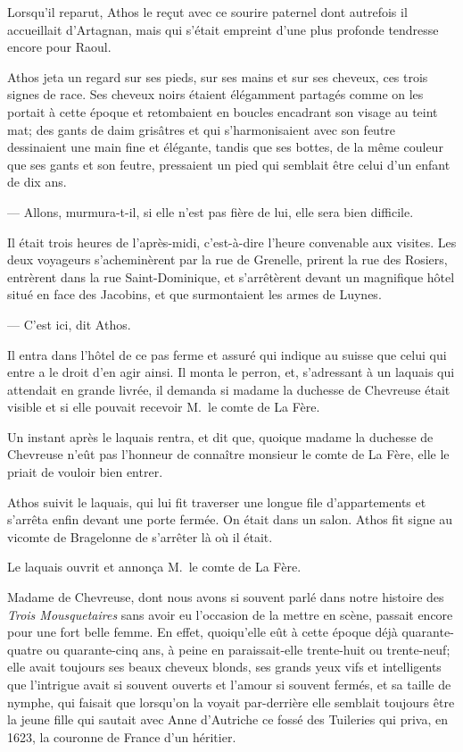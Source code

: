 Lorsqu'il reparut, Athos le reçut avec ce sourire paternel dont autrefois il accueillait d'Artagnan, mais qui s'était empreint d'une plus profonde tendresse encore pour Raoul.

Athos jeta un regard sur ses pieds, sur ses mains et sur ses cheveux, ces trois signes de race. Ses cheveux noirs étaient élégamment partagés comme on les portait à cette époque et retombaient en boucles encadrant son visage au teint mat; des gants de daim grisâtres et qui s'harmonisaient avec son feutre dessinaient une main fine et élégante, tandis que ses bottes, de la même couleur que ses gants et son feutre, pressaient un pied qui semblait être celui d'un enfant de dix ans.

— Allons, murmura-t-il, si elle n'est pas fière de lui, elle sera bien difficile.

Il était trois heures de l'après-midi, c'est-à-dire l'heure convenable aux visites. Les deux voyageurs s'acheminèrent par la rue de Grenelle, prirent la rue des Rosiers, entrèrent dans la rue Saint-Dominique, et s'arrêtèrent devant un magnifique hôtel situé en face des Jacobins, et que surmontaient les armes de Luynes.

— C'est ici, dit Athos.

Il entra dans l'hôtel de ce pas ferme et assuré qui indique au suisse que celui qui entre a le droit d'en agir ainsi. Il monta le perron, et, s'adressant à un laquais qui attendait en grande livrée, il demanda si madame la duchesse de Chevreuse était visible et si elle pouvait recevoir M.~le comte de La Fère.

Un instant après le laquais rentra, et dit que, quoique madame la duchesse de Chevreuse n'eût pas l'honneur de connaître monsieur le comte de La Fère, elle le priait de vouloir bien entrer.

Athos suivit le laquais, qui lui fit traverser une longue file d'appartements et s'arrêta enfin devant une porte fermée. On était dans un salon. Athos fit signe au vicomte de Bragelonne de s'arrêter là où il était.

Le laquais ouvrit et annonça M.~le comte de La Fère.

Madame de Chevreuse, dont nous avons si souvent parlé dans notre histoire des \textit{Trois Mousquetaires} sans avoir eu l'occasion de la mettre en scène, passait encore pour une fort belle femme. En effet, quoiqu'elle eût à cette époque déjà quarante-quatre ou quarante-cinq ans, à peine en paraissait-elle trente-huit ou trente-neuf; elle avait toujours ses beaux cheveux blonds, ses grands yeux vifs et intelligents que l'intrigue avait si souvent ouverts et l'amour si souvent fermés, et sa taille de nymphe, qui faisait que lorsqu'on la voyait par-derrière elle semblait toujours être la jeune fille qui sautait avec Anne d'Autriche ce fossé des Tuileries qui priva, en 1623, la couronne de France d'un héritier.

